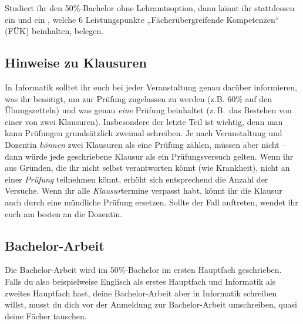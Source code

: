Studiert ihr den 50\%-Bachelor ohne Lehramtsoption, dann könnt ihr stattdessen ein  und ein , welche 6 Leistungspunkte „Fächerübergreifende Kompetenzen“ (FÜK) beinhalten, belegen.

\subsection{Hinweise zu Klausuren}
In Informatik solltet ihr euch bei jeder Veranstaltung genau darüber informieren, was ihr benötigt, um zur Prüfung zugelassen zu werden (z.B. 60\% auf den Übungszetteln) und was genau \emph{eine} Prüfung beinhaltet (z.\,B.\ das Bestehen von einer von zwei Klausuren). Insbesondere der letzte Teil ist wichtig, denn man kann Prüfungen grundsätzlich zweimal schreiben. Je nach Veranstaltung und Dozentin \emph{können} zwei Klausuren als eine Prüfung zählen, müssen aber nicht -- dann würde jede geschriebene Klausur als ein Prüfungsversuch gelten. Wenn ihr aus Gründen, die ihr nicht selbst verantworten könnt (wie Krankheit), nicht an einer \emph{Prüfung} teilnehmen könnt, erhöht sich entsprechend die Anzahl der Versuche. Wenn ihr alle \emph{Klausur}termine verpasst habt, könnt ihr die Klausur auch durch eine mündliche Prüfung ersetzen. Sollte der Fall auftreten, wendet ihr euch am besten an die Dozentin.

\subsection{Bachelor-Arbeit}
Die Bachelor-Arbeit wird im 50\%-Bachelor im ersten Hauptfach geschrieben. Falls du also beispielweise Englisch als erstes Hauptfach und Informatik als zweites Hauptfach hast, deine Bachelor-Arbeit aber in Informatik schreiben willst, musst du dich vor der Anmeldung zur Bachelor-Arbeit umschreiben, quasi deine Fächer tauschen.

